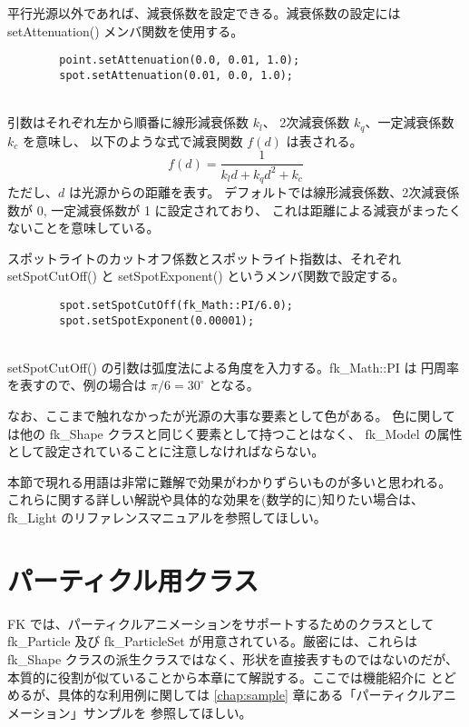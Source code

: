 平行光源以外であれば、減衰係数を設定できる。減衰係数の設定には
setAttenuation() メンバ関数を使用する。
\\
\begin{screen}
\begin{verbatim}
        point.setAttenuation(0.0, 0.01, 1.0);
        spot.setAttenuation(0.01, 0.0, 1.0);
\end{verbatim}
\end{screen}
~ \\
引数はそれぞれ左から順番に線形減衰係数 \(k_l\)、
2次減衰係数 \(k_q\)、一定減衰係数 \(k_c\) を意味し、
以下のような式で減衰関数 \(f(d)\) は表される。
\[
	f(d) = \frac{1}{k_ld + k_qd^2 + k_c}
\]
ただし、\(d\) は光源からの距離を表す。
デフォルトでは線形減衰係数、2次減衰係数が 0, 一定減衰係数が 1 に設定されており、
これは距離による減衰がまったくないことを意味している。

スポットライトのカットオフ係数とスポットライト指数は、それぞれ
setSpotCutOff() と setSpotExponent() というメンバ関数で設定する。
\\
\begin{screen}
\begin{verbatim}
        spot.setSpotCutOff(fk_Math::PI/6.0);
        spot.setSpotExponent(0.00001);
\end{verbatim}
\end{screen}
~ \\
setSpotCutOff() の引数は弧度法による角度を入力する。fk\_Math::PI は
円周率を表すので、例の場合は \(\pi/6 = 30^{\circ}\) となる。

なお、ここまで触れなかったが光源の大事な要素として色がある。
色に関しては他の fk\_Shape クラスと同じく要素として持つことはなく、
fk\_Model の属性として設定されていることに注意しなければならない。

本節で現れる用語は非常に難解で効果がわかりずらいものが多いと思われる。
これらに関する詳しい解説や具体的な効果を(数学的に)知りたい場合は、
fk\_Light のリファレンスマニュアルを参照してほしい。

\section{パーティクル用クラス} \label{sec:particle}
FK では、パーティクルアニメーションをサポートするためのクラスとして
fk\_Particle 及び fk\_ParticleSet が用意されている。厳密には、これらは
fk\_Shape クラスの派生クラスではなく、形状を直接表すものではないのだが、
本質的に役割が似ていることから本章にて解説する。ここでは機能紹介に
とどめるが、具体的な利用例に関しては
\ref{chap:sample} 章にある「パーティクルアニメーション」サンプルを
参照してほしい。

